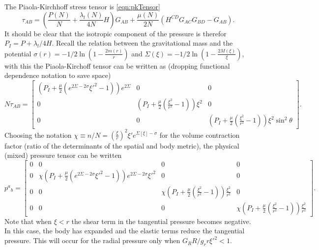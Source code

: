 The Piaola-Kirchhoff stress tensor is \eqref{eqn:pkTensor}
\begin{equation}
\tau_{AB} = \left(\frac{P(N)}{N} + \frac{\lambda_l(N)}{4N}H\right)G_{AB} + \frac{\mu(N)}{2N}\left(H^{CD}G_{AC}G_{BD} - G_{AB}\right).
\end{equation}
It should be clear that the isotropic component of the pressure is therefor $P_I = P + \lambda_l/4H$. Recall the relation between the gravitational mass and the potential $\sigma(r) = -1/2\ln{\left(1-\frac{2m(r)}{r}\right)}$ and $\Sigma(\xi) = -1/2\ln{\left(1-\frac{2M(\xi)}{\xi}\right)}$, with this the Piaola-Kirchoff tensor can be written as (dropping functional dependence notation to save space)
\begin{equation}
N\tau_{AB} = \left[
  \begin{array}{ccc}
    \left(P_I + \frac{\mu}{2}\left(e^{2\Sigma-2\sigma}\xi'^2 - 1\right)\right)e^{2\Sigma}& 0 & 0\\
    0 & \left(P_I + \frac{\mu}{2}\left(\frac{\xi^2}{r^2} - 1\right)\right)\xi^2& 0 \\
    0 & 0 & \left(P_I + \frac{\mu}{2}\left(\frac{\xi^2}{r^2} - 1\right)\right)\xi^2\sin^2\theta
  \end{array}
\right].
\end{equation}
Choosing the notation $\chi \equiv n/N = \left(\frac{\xi}{r}\right)^2\xi'e^{\Sigma[\xi]-\sigma}$ for the volume contraction factor (ratio of the determinants of the spatial and body metric), the physical (mixed) pressure tensor can be written
\begin{equation}
p^a{}_b = \left[
  \begin{array}{cccc}
    0 & 0 & 0 & 0 \\
    0 & \chi\left(P_I + \frac{\mu}{2}\left(e^{2\Sigma-2\sigma}\xi'^2 - 1\right)\right)e^{2\Sigma-2\sigma}\xi'^2 & 0 & 0 \\
    0 & 0 & \chi\left(P_I + \frac{\mu}{2}\left(\frac{\xi^2}{r^2} - 1\right)\right)\frac{\xi^2}{r^2} & 0 \\
    0 & 0 & 0 & \chi\left(P_I + \frac{\mu}{2}\left(\frac{\xi^2}{r^2} - 1\right)\right)\frac{\xi^2}{r^2}  \end{array}
\right].
\end{equation}
Note that when $\xi<r$ the shear term in the tangential pressure becomes negative. In this case, the body has expanded and the elastic terms reduce the tangential pressure. This will occur for the radial pressure only when $G_RR/g_rr\xi'^2<1$.
